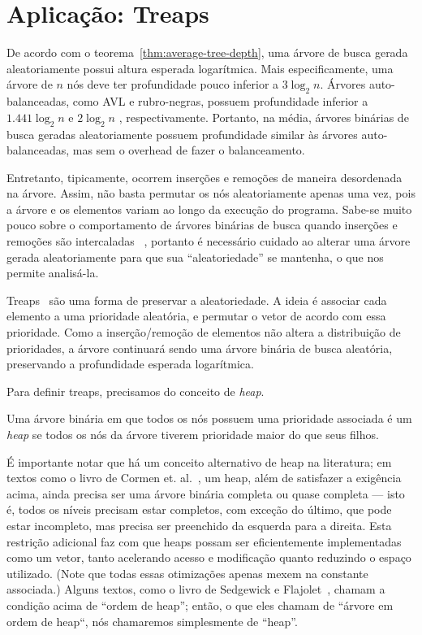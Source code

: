 \section{Aplicação: Treaps}
\label{sec:treaps}

De acordo com o teorema~\ref{thm:average-tree-depth},
uma árvore de busca gerada aleatoriamente
possui altura esperada logarítmica.
Mais especificamente,
uma árvore de $n$ nós
deve ter profundidade pouco inferior a $3 \log_2 n$.
Árvores auto-balanceadas,
como AVL e rubro-negras,
possuem profundidade inferior a $1.441 \log_2 n$ \cite[p.~460]{Knuth1998}
e $2 \log_2 n$ \cite[p.~309]{CormenLeisersonRivestStein2009},
respectivamente.
Portanto,
na média,
árvores binárias de busca geradas aleatoriamente
possuem profundidade similar às árvores auto-balanceadas,
mas sem o overhead de fazer o balanceamento.

Entretanto,
tipicamente, ocorrem inserções e remoções de maneira desordenada na árvore.
Assim,
não basta permutar os nós aleatoriamente apenas uma vez,
pois a árvore e os elementos variam ao longo da execução do programa.
Sabe-se muito pouco sobre o comportamento de árvores binárias de busca
quando inserções e remoções são intercaladas%
~\cite[p.~300]{CormenLeisersonRivestStein2009},
portanto é necessário cuidado ao alterar uma árvore gerada aleatoriamente
para que sua ``aleatoriedade'' se mantenha,
o que nos permite analisá-la.

Treaps~\cite{AragonSeidel1989} são uma forma de preservar a aleatoriedade.
A ideia é associar cada elemento a uma prioridade aleatória,
e permutar o vetor de acordo com essa prioridade.
Como a inserção/remoção de elementos
não altera a distribuição de prioridades,
a árvore continuará sendo uma árvore binária de busca aleatória,
preservando a profundidade esperada logarítmica.

Para definir treaps, precisamos do conceito de \emph{heap}.

\begin{definition}
    Uma árvore binária em que todos os nós possuem uma prioridade associada
    é um \emph{heap}
    se todos os nós da árvore tiverem prioridade maior do que seus filhos.
\end{definition}

É importante notar que há um conceito alternativo de heap na literatura;
em textos como o livro de Cormen et. al.~\cite[p.~152]{CormenLeisersonRivestStein2009},
um heap, além de satisfazer a exigência acima,
ainda precisa ser uma árvore binária completa ou quase completa
--- isto é, todos os níveis precisam estar completos,
com exceção do último, que pode estar incompleto,
mas precisa ser preenchido da esquerda para a direita.
Esta restrição adicional
faz com que heaps possam ser eficientemente implementadas como um vetor,
tanto acelerando acesso e modificação quanto reduzindo o espaço utilizado.
(Note que todas essas otimizações apenas mexem na constante associada.)
Alguns textos, como o livro de Sedgewick e Flajolet~\cite[p.~362]{SedgewickFlajolet2013},
chamam a condição acima de ``ordem de heap'';
então, o que eles chamam de ``árvore em ordem de heap``,
nós chamaremos simplesmente de ``heap''.

